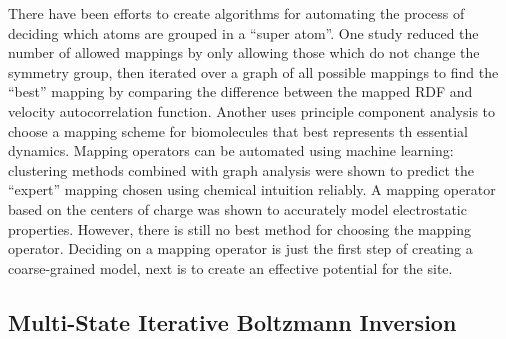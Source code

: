 There have been efforts to create algorithms for automating the process of deciding which atoms are grouped in a ``super atom''.
One study reduced the number of allowed mappings by only allowing those which do not change the symmetry group, then iterated over a graph of all possible mappings to find the ``best'' mapping by comparing the difference between the mapped RDF and velocity autocorrelation function\cite{Chakraborty2018b}.
Another uses principle component analysis to choose a mapping scheme for biomolecules that best represents th essential dynamics\cite{Zhang2008}.
Mapping operators can be automated using machine learning: clustering methods combined with graph analysis were shown to predict the ``expert'' mapping chosen using chemical intuition reliably\cite{Li2020}. 
A mapping operator based on the centers of charge was shown to accurately model electrostatic properties\cite{Cao2015a}.
However, there is still no best method for choosing the mapping operator.
Deciding on a mapping operator is just the first step of creating a coarse-grained model, next is to create an effective potential for the site.

\subsection*{Multi-State Iterative Boltzmann Inversion}

